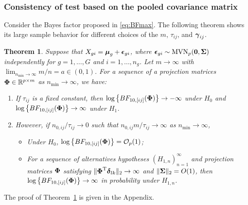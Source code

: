 \documentclass[pdflatex,sn-basic]{sn-jnl}%
\def\bzero{{\mathbf 0}}
\def\log{\hbox{log}}
\def\MVN{\hbox{MVN}}
\def\log{\hbox{log}}
\def\trans{^{\rm T}}
\def\bzero{{\mathbf 0}}
\newcommand{\bSigma}{\mbox{\boldmath $\Sigma$}}
\newcommand{\ugamma}            {\mbox{\boldmath$\gamma$}}
\newcommand{\udelta}            {\mbox{\boldmath$\delta$}}
\newcommand{\uepsilon}          {\mbox{\boldmath$\epsilon$}}
\newcommand{\umu}               {\mbox{\boldmath$\mu$}}
\newcommand{\uSigma}            {\mbox{\boldmath$\Sigma$}}
\newcommand{\uPhi}              {\mbox{\boldmath$\Phi$}}
\theoremstyle{thmstyleone}%
\newtheorem{theorem}{Theorem}%
\theoremstyle{thmstyletwo}%
\theoremstyle{thmstylethree}%
\begin{document}
\subsubsection{Consistency of test based on the pooled covariance matrix}
Consider the Bayes factor proposed in \eqref{eq:BFmax}. The following theorem shows its large sample behavior for different choices of the $m$, $\tau_{ij}$, and $\ugamma_{ij}$. 
\begin{theorem}\label{Thrm1}
Suppose that $X_{gi} = \umu_g + \uepsilon_{gi}$, where $\uepsilon_{gi} \sim \MVN_{p}(\bzero, \uSigma)$ independently for $g = 1, \ldots, G$ and $i = 1,\ldots,n_g$. Let $m \rightarrow \infty$ with $ \lim_{n_{\min} \rightarrow \infty} m / n =  a \in  (0, 1)$. For a sequence of a projection matrices $\uPhi \in \mathbb{R}^{p \times m}$ as $n_{\min} \rightarrow \infty$, we have:
\begin{enumerate}
    \item If $\tau_{ij}$ is a fixed constant, 
    then $\log\left\{BF_{10, [ij]}(\uPhi) \right\} \rightarrow -\infty$ under $H_0$ and $\log\left\{BF_{10, [ij]}(\uPhi) \right\} \rightarrow \infty$ under $H_1$. 
    \item However, if 
    $n_{0,ij}/\tau_{ij} \rightarrow 0$ such that $n_{0,ij}m/\tau_{ij} \rightarrow \infty$ as $n_{\min} \rightarrow \infty$,  
   
    \begin{itemize}
        \item[(a)] Under $H_0$, $\log\left\{BF_{10, [ij]}(\uPhi) \right\} = \mathcal{O}_{p}(1)$;
        \item[(b)] 
        For a sequence of alternatives hypotheses $(H_{1,n})_{n = 1}^\infty$ and projection matrices $\uPhi$ satisfying $\|\uPhi\trans\udelta_{lk}\|_2\to\infty$ and $\|\bSigma\|_2 = O(1)$, then $\log\left\{BF_{10, [ij]}(\uPhi) \right\} \rightarrow \infty$ in probability under $H_{1,n}$. 
    \end{itemize} 
\end{enumerate}
\end{theorem}
The proof of Theorem~\ref{Thrm1} is given in the Appendix.
\end{document}
